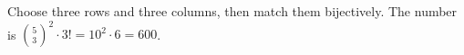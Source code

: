 Choose three rows and three columns, then match them bijectively. The number is $\binom53^2\cdot3!=10^2\cdot6=\boxed{600}$.

